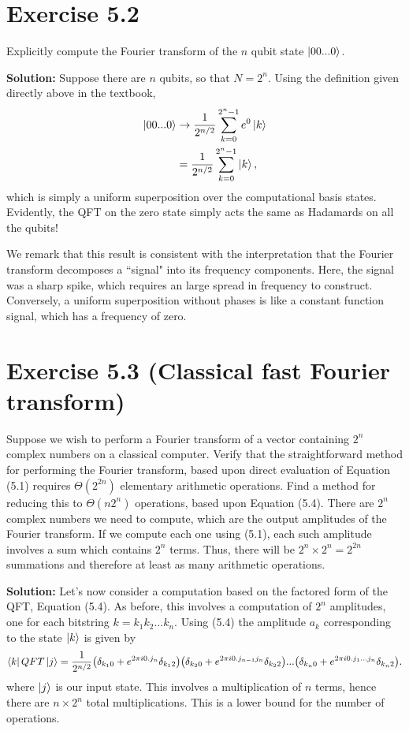 \documentclass{book}
\begin{document}
\section*{Exercise 5.2}
    Explicitly compute the Fourier transform of the $n$ qubit state $\ket{00...0}$.
    
    \textbf{Solution:} Suppose there are $n$ qubits, so that $N=2^n$. Using the definition given directly above in the textbook,
    \begin{align}
        \ket{00...0} &\rightarrow \frac{1}{2^{n/2}} \sum_{k=0}^{2^n-1}e^0 \ket{k} \\
        &= \frac{1}{2^{n/2}}\sum_{k=0}^{2^n-1}\ket{k},
    \end{align}
    which is simply a uniform superposition over the computational basis states. Evidently, the QFT on the zero state simply acts the same as Hadamards on all the qubits!
    
    We remark that this result is consistent with the interpretation that the Fourier transform decomposes a ``signal" into its frequency components. Here, the signal was a sharp spike, which requires an large spread in frequency to construct. Conversely, a uniform superposition without phases is like a constant function signal, which has a frequency of zero. 

\section*{Exercise 5.3 (Classical fast Fourier transform)} 
    Suppose we wish to perform a Fourier transform of a vector containing $2^n$ complex numbers on a classical computer. Verify that the straightforward method for performing the Fourier transform, based upon direct evaluation of Equation (5.1) requires $\Theta(2^{2n})$ elementary arithmetic operations. Find a method for reducing this to $\Theta(n2^n)$ operations, based upon Equation (5.4).
    There are $2^n$ complex numbers we need to compute, which are the output amplitudes of the Fourier transform. If we compute each one using (5.1), each such amplitude involves a sum which contains $2^n$ terms. Thus, there will be $2^n \times 2^n = 2^{2n}$ summations and therefore at least as many arithmetic operations.
    
    \textbf{Solution:} Let's now consider a computation based on the factored form of the QFT, Equation (5.4). As before, this involves a computation of $2^n$ amplitudes, one for each bitstring $k = k_1k_2...k_n$. Using (5.4) the amplitude $a_{k}$ corresponding to the state $\ket{k}$ is given by
    \begin{align}
        \bra{k}QFT\ket{j} = \frac{1}{2^{n/2}}\big(\delta_{k_1 0}+e^{2\pi i0.j_n}\delta_{k_1 2}\big)\big(\delta_{k_2 0}+e^{2\pi i0.j_{n-1}j_n}\delta_{k_2 2}\big)...\big(\delta_{k_n 0}+e^{2\pi i0.j_1...j_n}\delta_{k_n 2}\big).
    \end{align}
    where $\ket{j}$ is our input state. This involves a multiplication of $n$ terms, hence there are $n\times 2^n$ total multiplications. This is a lower bound for the number of operations. 
\end{document}
